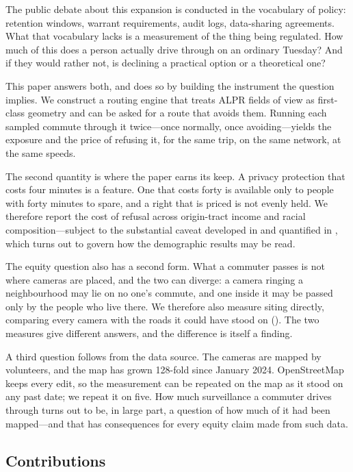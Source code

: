\documentclass[11pt,twoside]{article}
\newcommand{\alpr}{ALPR\xspace}
\begin{document}
The public debate about this expansion is conducted in the vocabulary of policy: retention
windows, warrant requirements, audit logs, data-sharing agreements. What that vocabulary
lacks is a measurement of the thing being regulated. How much of this does a person
actually drive through on an ordinary Tuesday? And if they would rather not, is declining
a practical option or a theoretical one?

This paper answers both, and does so by building the instrument the question implies. We
construct a routing engine that treats \alpr fields of view as first-class geometry and
can be asked for a route that avoids them. Running each sampled commute through it
twice---once normally, once avoiding---yields the exposure and the price of refusing it, for
the same trip, on the same network, at the same speeds.

The second quantity is where the paper earns its keep. A privacy protection that costs
four minutes is a feature. One that costs forty is available only to people with forty
minutes to spare, and a right that is priced is not evenly held. We therefore report the
cost of refusal across origin-tract income and racial composition---subject to the
substantial caveat developed in  and quantified in
, which turns out to govern how the demographic results may be
read.

The equity question also has a second form. What a commuter passes is not where cameras are
placed, and the two can diverge: a camera ringing a neighbourhood may lie on no one's commute,
and one inside it may be passed only by the people who live there. We therefore also measure
siting directly, comparing every camera with the roads it could have stood on
(). The two measures give different answers, and the difference is
itself a finding.

A third question follows from the data source. The cameras are mapped by volunteers, and
the map has grown 128-fold since January 2024. OpenStreetMap keeps every edit, so the
measurement can be repeated on the map as it stood on any past date; we repeat it on five.
How much surveillance a commuter drives through turns out to be, in large part, a question
of how much of it had been mapped---and that has consequences for every equity claim made
from such data.

\subsection{Contributions}
\end{document}
